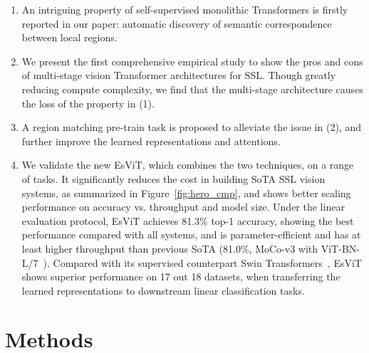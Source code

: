 \documentclass{article} \usepackage{iclr2022_conference,times}
\newcommand{\shortname}{EsViT}
\begin{document}
\begin{minipage}{1.0\textwidth}
\centering

\begin{enumerate}[label=(\arabic*),leftmargin=5.5mm]
\item  An intriguing property of self-supervised monolithic Transformers is firstly reported in our paper: automatic discovery of semantic correspondence between local regions. 

\item  We present the first comprehensive empirical study to show the pros and cons of multi-stage vision Transformer architectures for SSL. Though greatly reducing compute complexity, we find that the multi-stage architecture causes the loss of the property in (1).  

\item 
A region matching pre-train task is proposed to alleviate the issue in (2), and further improve the learned representations and attentions.

\item  
We validate the new \shortname{}, which combines the two techniques, on a range of tasks.
It significantly reduces the cost in building SoTA SSL vision systems, as summarized in Figure~\ref{fig:hero_cmp}, and shows better scaling performance on accuracy vs. throughput and model size.
Under the linear evaluation protocol, \shortname{} achieves 81.3\% top-1 accuracy, showing the best performance compared with all systems, and is  parameter-efficient and has at least  higher throughput than previous SoTA (81.0\%, MoCo-v3 with ViT-BN-L/7~\citep{chen2021empirical}). 
Compared with its supervised counterpart Swin Transformers~\citep{liu2021Swin}, \shortname{} shows superior performance on 17 out 18 datasets, when transferring the learned representations to downstream linear classification tasks. 

\end{enumerate}

\end{minipage}











\vspace{-1mm}
\section{Methods}
\vspace{-3mm}
\end{document}
